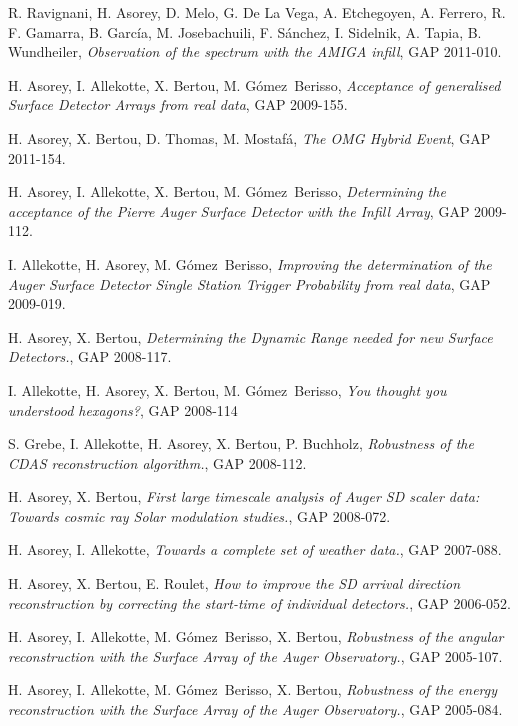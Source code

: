 \begin{etaremune}
\item {} R. Ravignani, H. Asorey, D. Melo, G. De La Vega, A. Etchegoyen, A. Ferrero, R. F. Gamarra, B. García, M. Josebachuili, F. Sánchez, I. Sidelnik, A. Tapia, B. Wundheiler, {\emph{Observation of the spectrum with the AMIGA infill}}, GAP 2011-010.

\item {}H. Asorey, I. Allekotte, X. Bertou, M. Gómez~Berisso, {\emph{Acceptance of generalised Surface Detector Arrays from real data}}, GAP 2009-155.

\item {}H. Asorey, X. Bertou, D. Thomas, M. Mostafá, {\emph{The OMG Hybrid Event}}, GAP 2011-154.

\item {}H. Asorey, I. Allekotte, X. Bertou, M. Gómez~Berisso, {\emph{Determining the acceptance of the Pierre Auger Surface Detector with the Infill Array}}, GAP 2009-112.

\item {}I. Allekotte, H. Asorey, M. Gómez~Berisso, {\emph{Improving the determination of the Auger Surface Detector Single Station Trigger Probability from real data}}, GAP 2009-019.

\item {}H. Asorey, X. Bertou, {\emph{Determining the Dynamic Range needed for new Surface Detectors.}}, GAP 2008-117.

\item {}I. Allekotte, H. Asorey, X. Bertou, M. Gómez~Berisso, {\emph{You thought you understood hexagons?}}, GAP 2008-114

\item {}S. Grebe, I. Allekotte, H. Asorey, X. Bertou, P. Buchholz, {\emph{Robustness of the CDAS reconstruction algorithm.}}, GAP 2008-112.

\item {}H. Asorey, X. Bertou, {\emph{First large timescale analysis of Auger SD scaler data: Towards cosmic ray Solar modulation studies.}}, GAP 2008-072.

\item {}H. Asorey, I. Allekotte, {\emph{Towards a complete set of weather data.}}, GAP 2007-088.

\item {}H. Asorey, X. Bertou, E. Roulet, {\emph{How to improve the SD arrival direction reconstruction by correcting the start-time of individual detectors.}}, GAP 2006-052.

\item {}H. Asorey, I. Allekotte, M. Gómez~Berisso, X. Bertou, {\emph{Robustness of the angular reconstruction with the Surface Array of the Auger Observatory.}}, GAP 2005-107.

\item {}H. Asorey, I. Allekotte, M. Gómez~Berisso, X. Bertou, {\emph{Robustness of the energy reconstruction with the Surface Array of the Auger Observatory.}}, GAP 2005-084.
\end{etaremune}
